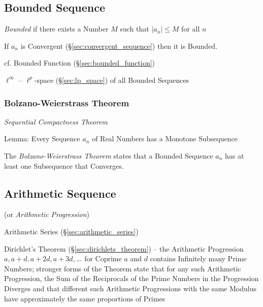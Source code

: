 \subsection{Bounded Sequence}\label{sec:bounded_sequence}

\emph{Bounded} if there exists a Number $M$ such that $|a_n| \leq M$ for all $n$

If $a_n$ is Convergent (\S\ref{sec:convergent_sequence}) then it is
Bounded.

\fist cf. Bounded Function (\S\ref{sec:bounded_function})

$\ell^\infty$ -- $\ell^p$-space (\S\ref{sec:lp_space}) of all Bounded Sequences



\subsubsection{Bolzano-Weierstrass Theorem}\label{sec:bolzano_weierstrass}

\emph{Sequential Compactness Theorem}

Lemma: Every Sequence $a_n$ of Real Numbers has a Monotone
Subsequence

The \emph{Bolzano-Weierstrass Theorem} states that a Bounded Sequence
$a_n$ has at least one Subsequence that Converges.



\subsection{Arithmetic Sequence}\label{sec:arithmetic_sequence}

(or \emph{Arithmetic Progression})

Arithmetic Series (\S\ref{sec:arithmetic_series})

Dirichlet's Theorem (\S\ref{sec:dirichlets_theorem}) -- the Arithmetic
Progression $a, a + d, a + 2d, a + 3d, \ldots$ for Coprime $a$ and $d$ contains
Infinitely many Prime Numbers; stronger forms of the Theorem state that for any
such Arithmetic Progression, the Sum of the Reciprocals of the Prime Numbers in
the Progression Diverges and that different such Arithmetic Progressions with
the same Modulus have approximately the same proportions of Primes



